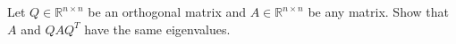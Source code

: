Let $Q \in \mathbb{R}^{n \times n}$ be an orthogonal matrix and $A \in \mathbb{R}^{n \times n}$ be any matrix. Show that $A$ and $Q A Q^T$ have the same eigenvalues.\\

 